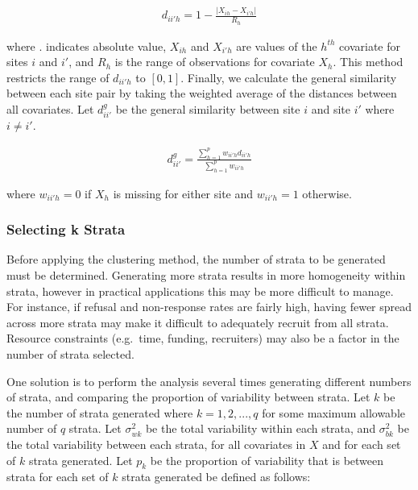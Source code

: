 \documentclass[man,floatsintext]{apa6}
\begin{document}
\begin{align}
  d_{ii'h} = 1 - \frac{|X_{ih} - X_{i'h}|}{R_h}
\end{align}

where \textbar{}.\textbar{} indicates absolute value, \(X_{ih}\) and \(X_{i'h}\) are values of the \(h^{th}\) covariate for sites \(i\) and \(i'\), and \(R_h\) is the range of observations for covariate \(X_h\). This method restricts the range of \(d_{ii'h}\) to \([0,1]\). Finally, we calculate the general similarity between each site pair by taking the weighted average of the distances between all covariates. Let \(d^{g}_{ii'}\) be the general similarity between site \(i\) and site \(i'\) where \(i \ne i'\).

\begin{align}
  d^{g}_{ii'} = \frac{\sum^p_{h = 1}w_{ii'h}d_{ii'h}}{\sum^p_{h = 1}w_{ii'h}}
\end{align}

where \(w_{ii'h} = 0\) if \(X_h\) is missing for either site and \(w_{ii'h} = 1\) otherwise.

\hypertarget{selecting-k-strata}{%
\subsubsection{Selecting k Strata}\label{selecting-k-strata}}

Before applying the clustering method, the number of strata to be generated must be determined. Generating more strata results in more homogeneity within strata, however in practical applications this may be more difficult to manage. For instance, if refusal and non-response rates are fairly high, having fewer spread across more strata may make it difficult to adequately recruit from all strata. Resource constraints (e.g.~time, funding, recruiters) may also be a factor in the number of strata selected.

One solution is to perform the analysis several times generating different numbers of strata, and comparing the proportion of variability between strata. Let \(k\) be the number of strata generated where \(k = 1, 2, ..., q\) for some maximum allowable number of \(q\) strata. Let \(\sigma_{wk}^2\) be the total variability within each strata, and \(\sigma_{bk}^2\) be the total variability between each strata, for all covariates in \(X\) and for each set of \(k\) strata generated. Let \(p_k\) be the proportion of variability that is between strata for each set of \(k\) strata generated be defined as follows:
\end{document}
